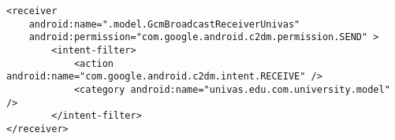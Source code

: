 \begin{lstlisting}[style=custom_XML]
<receiver
	android:name=".model.GcmBroadcastReceiverUnivas"
	android:permission="com.google.android.c2dm.permission.SEND" >
		<intent-filter>
		    <action android:name="com.google.android.c2dm.intent.RECEIVE" />
		    <category android:name="univas.edu.com.university.model" />
		</intent-filter>
</receiver>
\end{lstlisting}